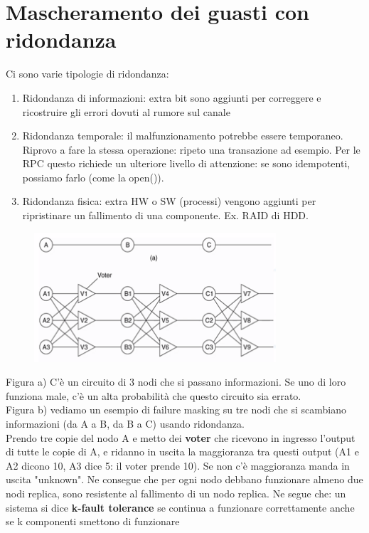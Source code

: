\documentclass[12pt,italian]{report}
\begin{document}
\section{Mascheramento dei guasti con ridondanza}
Ci sono varie tipologie di ridondanza:
\begin{enumerate}
    \item Ridondanza di informazioni: extra bit sono aggiunti per correggere e ricostruire gli errori dovuti al rumore sul canale
    \item Ridondanza temporale: il malfunzionamento potrebbe essere temporaneo. Riprovo a fare la stessa operazione: ripeto una transazione ad esempio. Per le RPC questo richiede un ulteriore livello di attenzione: se sono idempotenti, possiamo farlo (come la open()).
    \item Ridondanza fisica: extra HW o SW (processi) vengono aggiunti per ripristinare un fallimento di una componente. Ex. RAID di HDD.
\end{enumerate}

\begin{figure}[h]
\centering
\includegraphics[width=90mm]{img/ridondanza.png}
\end{figure}
\noindent Figura a) C'è un circuito di 3 nodi che si passano informazioni. Se uno di loro funziona male, c'è un alta probabilità che questo circuito sia errato. \\ Figura b) vediamo un esempio di failure masking su tre nodi che si scambiano informazioni (da A a B, da B a C) usando ridondanza. \\ Prendo tre copie del nodo A e metto dei \textbf{voter} che ricevono in ingresso l'output di tutte le copie di A, e ridanno in uscita la maggioranza tra questi output (A1 e A2 dicono 10, A3 dice 5: il voter prende 10). Se non c'è maggioranza manda in uscita "unknown". Ne consegue che per ogni nodo debbano funzionare almeno due nodi replica, sono resistente al fallimento di un nodo replica. 
\bigbreak
Ne segue che: un sistema si dice \textbf{k-fault tolerance} se continua a funzionare correttamente anche se k componenti smettono di funzionare
\end{document}
